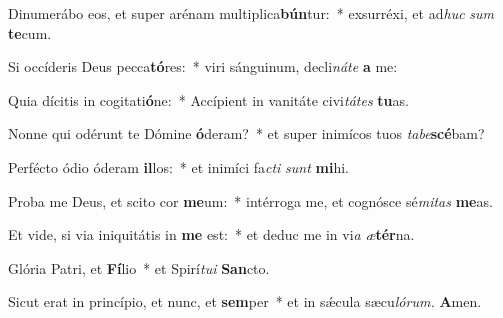 \item Dinumerábo eos, et super arénam multiplica\textbf{bún}tur:~* exsurréxi, et ad\textit{huc} \textit{sum} \textbf{te}cum.
\item Si occíderis Deus pecca\textbf{tó}res:~* viri sánguinum, decli\textit{náte} \textbf{a} me:
\item Quia dícitis in cogitati\textbf{ó}ne:~* Accípient in vanitáte civi\textit{tátes} \textbf{tu}as.
\item Nonne qui odérunt te Dómine \textbf{ó}deram?~* et super inimícos tuos \textit{tabe}\textbf{scé}bam?
\item Perfécto ódio óderam \textbf{il}los:~* et inimíci fa\hspace*{0.02em}\textit{cti} \textit{sunt} \textbf{mi}hi.
\item Proba me Deus, et scito cor \textbf{me}um:~* intérroga me, et cognósce sé\textit{mitas} \textbf{me}as.
\item Et vide, si via iniquitátis in \textbf{me} est:~* et deduc me in vi\hspace*{0.02em}\textit{a} \textit{æ}\textbf{tér}na.
\item Glória Patri, et \textbf{Fí}lio~* et Spirí\tinyhspace\textit{tui} \textbf{San}cto.
\item Sicut erat in princípio, et nunc, et \textbf{sem}per~* et in sǽcula sæcu\tinyhspace\textit{lórum.} \textbf{A}men.
